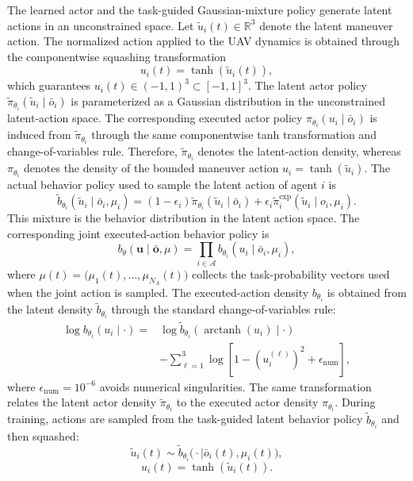 \documentclass{cja}
\begin{document}
The learned actor and the task-guided Gaussian-mixture policy generate latent actions in an unconstrained space. Let $\widetilde u_i(t)\in\mathbb R^3$ denote the latent maneuver action. The normalized action applied to the UAV dynamics is obtained through the componentwise squashing transformation
\begin{equation}
u_i(t)
=
\tanh\!\left(\widetilde u_i(t)\right),
\end{equation}
which guarantees $u_i(t)\in(-1,1)^3\subset[-1,1]^3$.
The latent actor policy $\widetilde\pi_{\theta_i}(\widetilde u_i\mid\bar o_i)$ is parameterized as a Gaussian distribution in the unconstrained latent-action space. The corresponding executed actor policy $\pi_{\theta_i}(u_i\mid\bar o_i)$ is induced from $\widetilde\pi_{\theta_i}$ through the same componentwise tanh transformation and change-of-variables rule. Therefore, $\widetilde\pi_{\theta_i}$ denotes the latent-action density, whereas $\pi_{\theta_i}$ denotes the density of the bounded maneuver action $u_i=\tanh(\widetilde u_i)$.
The actual behavior policy used to sample the latent action of agent $i$ is
\begin{equation}
\widetilde b_{\theta_i}(\widetilde u_i\mid\bar o_i,\mu_i)
=
(1-\epsilon_i)\widetilde\pi_{\theta_i}(\widetilde u_i\mid\bar o_i)
+\epsilon_i\widetilde\pi_i^{\mathrm{exp}}(\widetilde u_i\mid o_i,\mu_i).
\end{equation}
This mixture is the behavior distribution in the latent action space.
The corresponding joint executed-action behavior policy is
\begin{equation}
b_\theta(\mathbf u\mid\bar{\mathbf o},\mu)
=
\prod_{i\in\mathcal A}b_{\theta_i}(u_i\mid\bar o_i,\mu_i),
\end{equation}
where $\mu(t)=\bigl(\mu_1(t),\ldots,\mu_{N_A}(t)\bigr)$ collects the task-probability vectors used when the joint action is sampled. The executed-action density $b_{\theta_i}$ is obtained from the latent density $\widetilde b_{\theta_i}$ through the standard change-of-variables rule:
\begin{equation}
\begin{aligned}
\log b_{\theta_i}(u_i\mid\cdot)
= {}&
\log
\widetilde b_{\theta_i}
\left(
\operatorname{arctanh}(u_i)\mid\cdot
\right)
\\
&-
\sum_{\ell=1}^{3}
\log
\left[
1-\left(u_i^{(\ell)}\right)^2+\epsilon_{\mathrm{num}}
\right],
\end{aligned}
\end{equation}
where $\epsilon_{\mathrm{num}}=10^{-6}$ avoids numerical singularities. The same transformation relates the latent actor density $\widetilde\pi_{\theta_i}$ to the executed actor density $\pi_{\theta_i}$. During training, actions are sampled from the task-guided latent behavior policy $\widetilde b_{\theta_i}$ and then squashed:
\begin{equation}
\widetilde u_i(t)
\sim
\widetilde b_{\theta_i}
\bigl(\cdot\mid\bar o_i(t),\mu_i(t)\bigr),
\end{equation}
\begin{equation}
u_i(t)
=
\tanh\!\left(\widetilde u_i(t)\right).
\end{equation}
\end{document}

